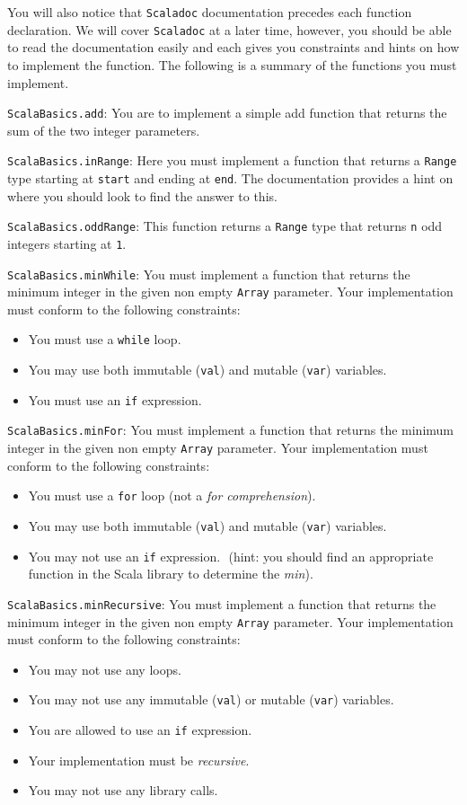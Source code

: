 \documentclass[12pt,a4paper]{exam}
\begin{document}
You will also notice that \verb!Scaladoc! documentation precedes each function declaration. 
We will cover \verb!Scaladoc! at a later time, however, you should be able to read the documentation 
easily and each gives you constraints and hints on how to implement the function. 
The following is a summary of the functions you must implement.
\begin{questions}
\question
\verb!ScalaBasics.add!: You are to implement a simple add function that returns 
the sum of the two integer parameters.

\question
\verb!ScalaBasics.inRange!: Here you must implement a function that returns a \verb!Range! 
type starting at \verb!start! and ending at \verb!end!. 
The documentation provides a hint on where you should look to find the answer to this.

\question
\verb!ScalaBasics.oddRange!: This function returns a \verb!Range! type that returns \verb!n! 
odd integers starting at \verb!1!.

\question
\verb!ScalaBasics.minWhile!: 
You must implement a function that returns the minimum integer in the given non empty \verb!Array! parameter. 
Your implementation must conform to the following constraints:
\begin{itemize}
	\item You must use a \verb!while! loop.
	\item You may use both immutable (\verb!val!) and mutable (\verb!var!) variables. 
	\item You must use an \verb!if! expression.
\end{itemize}

\question
\verb!ScalaBasics.minFor!: 
You must implement a function that returns the minimum integer in the given non empty \verb!Array! 
parameter. Your implementation must conform to the following constraints:
\begin{itemize}
	\item You must use a \verb!for! loop (not a \emph{for comprehension}).
	\item You may use both immutable (\verb!val!) and mutable (\verb!var!) variables.
	\item You may not use an \verb!if! expression.  (hint: you should find an appropriate function in the Scala library to determine the \emph{min}).
\end{itemize}

\question
\verb!ScalaBasics.minRecursive!: 
You must implement a function that returns the minimum integer in the given non empty \verb!Array! parameter. 
Your implementation must conform to the following constraints:
\begin{itemize}
	\item You may not use any loops.
	\item You may not use any immutable (\verb!val!) or mutable (\verb!var!) variables. 
	\item You are allowed to use an \verb!if! expression.
	\item Your implementation must be \emph{recursive}.	
	\item You may not use any library calls.
\end{itemize}


\end{questions}
\end{document}
